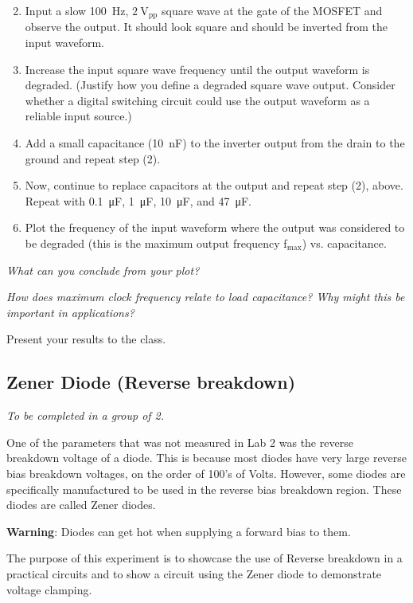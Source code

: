 \documentclass[12pt]{../manual}
\begin{document}
\begin{enumerate}
\setcounter{enumi}{1}
\item Input a slow \SI{100}{\hertz}, $\SI{2}{\volt}_\mathrm{pp}$ square wave at the gate of the MOSFET and observe the output. It should look square and should be inverted from the input waveform.
\item Increase the input square wave frequency until the output waveform is degraded. (Justify how you define a degraded square wave output. Consider whether a digital switching circuit could use the output waveform as a reliable input source.)
\item Add a small capacitance (\SI{10}{\nano\F}) to the inverter output from the drain to the ground and repeat step (2).
\item  Now, continue to replace capacitors at the output and repeat step (2), above. Repeat
with \SI{0.1}{\micro\F}, \SI{1}{\micro\F}, \SI{10}{\micro\F}, and \SI{47}{\micro\F}.
\item Plot the frequency of the input waveform where the output was considered to be
degraded (this is the maximum output frequency f$_\mathrm{max}$) vs. capacitance.
\end{enumerate}

{\it What can you conclude from your plot?}

{\it How does maximum clock frequency relate to load capacitance? Why might this be important in applications?}

Present your results to the class.

\newpage
\subsection{Zener Diode (Reverse breakdown)}
\textit{To be completed in a group of 2.}

One of the parameters that was not measured in Lab 2 was the reverse breakdown voltage of a diode. This is because most diodes have very large reverse bias breakdown voltages, on the order of 100's of Volts. However, some diodes are specifically manufactured to be used in the reverse bias breakdown region. These diodes are called Zener diodes.

{\bf Warning}: Diodes can get hot when supplying a forward bias to them.

The purpose of this experiment is to showcase the use of Reverse breakdown in a practical circuits and to show a circuit using the Zener diode to demonstrate voltage clamping.
\end{document}
